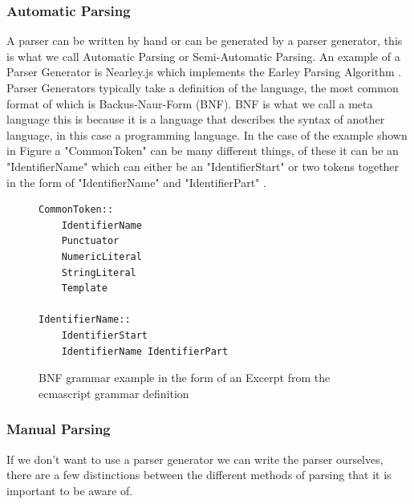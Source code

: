 \subsubsection{\textbf{Automatic Parsing}}
A parser can be written by hand or can be generated by a parser generator, this is what we call Automatic Parsing or Semi-Automatic Parsing. 
An example of a Parser Generator is Nearley.js\cite{nearley.js} which implements the Earley Parsing Algorithm \cite{earley}.
\label{section:bnf}
Parser Generators typically take a definition of the language, the most common format of which is Backus-Naur-Form (BNF). 
BNF is what we call a meta language 
this is because it is a language that describes the syntax of another language, in this case a programming language. In the case of the example shown in Figure  
a "CommonToken" can be many different things, of these it can be an "IdentifierName" which can either be an "IdentifierStart" or two tokens together in the form of "IdentifierName" and "IdentifierPart"
\cite{bnf}.
\begin{figure}[h]
\begin{verbatim}
CommonToken::
    IdentifierName
    Punctuator
    NumericLiteral
    StringLiteral
    Template
        
IdentifierName::
    IdentifierStart
    IdentifierName IdentifierPart
        \end{verbatim}
    \caption{BNF grammar example in the form of an Excerpt from the ecmascript grammar definition \cite{ecmascript2017}}
    \label{fig:bnf-emca}
\end{figure}
\subsubsection{\textbf{Manual Parsing}}
If we don't want to use a parser generator we can write the parser ourselves, there are a few distinctions between the different 
methods of parsing that it is important to be aware of.


